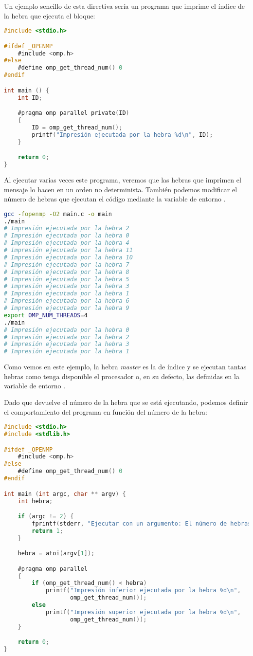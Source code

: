 Un ejemplo sencillo de esta directiva sería un programa que imprime el índice de la hebra que ejecuta el bloque:

\begin{lstlisting}[language=C]
#include <stdio.h>

#ifdef _OPENMP
	#include <omp.h>
#else
	#define omp_get_thread_num() 0
#endif

int main () {
	int ID;

	#pragma omp parallel private(ID)
	{
		ID = omp_get_thread_num();
		printf("Impresión ejecutada por la hebra %d\n", ID);
	}

	return 0;
}
\end{lstlisting}

Al ejecutar varias veces este programa, veremos que las hebras que imprimen el mensaje lo hacen en un orden no determinista.
También podemos modificar el número de hebras que ejecutan el código mediante la variable de entorno .

\begin{lstlisting}[language=sh]
gcc -fopenmp -O2 main.c -o main
./main
# Impresión ejecutada por la hebra 2
# Impresión ejecutada por la hebra 0
# Impresión ejecutada por la hebra 4
# Impresión ejecutada por la hebra 11
# Impresión ejecutada por la hebra 10
# Impresión ejecutada por la hebra 7
# Impresión ejecutada por la hebra 8
# Impresión ejecutada por la hebra 5
# Impresión ejecutada por la hebra 3
# Impresión ejecutada por la hebra 1
# Impresión ejecutada por la hebra 6
# Impresión ejecutada por la hebra 9
export OMP_NUM_THREADS=4
./main
# Impresión ejecutada por la hebra 0
# Impresión ejecutada por la hebra 2
# Impresión ejecutada por la hebra 3
# Impresión ejecutada por la hebra 1
\end{lstlisting}

Como vemos en este ejemplo, la hebra \textit{master} es la de índice  y se ejecutan tantas hebras como tenga disponible el procesador o, en su defecto, las definidas en la variable de entorno .

Dado que  devuelve el número de la hebra que se está ejecutando, podemos definir el comportamiento del programa en función del número de la hebra:

\begin{lstlisting}[language=C]
#include <stdio.h>
#include <stdlib.h>

#ifdef _OPENMP
	#include <omp.h>
#else
	#define omp_get_thread_num() 0
#endif

int main (int argc, char ** argv) {
	int hebra;

	if (argc != 2) {
		fprintf(stderr, "Ejecutar con un argumento: El número de hebras.\n");
		return 1;
	}

	hebra = atoi(argv[1]);

	#pragma omp parallel
	{
		if (omp_get_thread_num() < hebra)
			printf("Impresión inferior ejecutada por la hebra %d\n",
			       omp_get_thread_num());
		else
			printf("Impresión superior ejecutada por la hebra %d\n",
			       omp_get_thread_num());
	}

	return 0;
}
\end{lstlisting}


